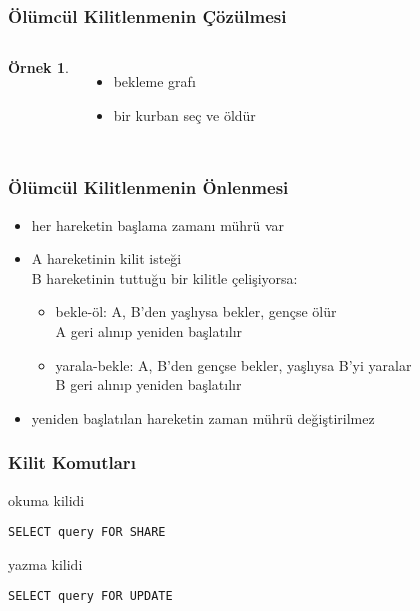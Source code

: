 \documentclass[dvipsnames]{beamer}
\theoremstyle{definition}
\theoremstyle{example}
\newtheorem{ornek}[theorem]{Örnek}
\theoremstyle{plain}
\begin{document}
\begin{frame}
  \frametitle{Ölümcül Kilitlenmenin Çözülmesi}

  \begin{columns}[t]
    \begin{ornek}
      \begin{center}
      \end{center}
    \end{ornek}

    \begin{itemize}
      \item bekleme grafı

      \pause
      \item bir \alert{kurban} seç ve öldür
    \end{itemize}
  \end{columns}
\end{frame}

\begin{frame}
  \frametitle{Ölümcül Kilitlenmenin Önlenmesi}

  \begin{itemize}
    \item her hareketin başlama zamanı mührü var

    \pause
    \item A hareketinin kilit isteği\\
      B hareketinin tuttuğu bir kilitle çelişiyorsa:
    \begin{itemize}
      \item \alert{bekle-öl}: A, B'den yaşlıysa bekler, gençse ölür\\
        A geri alınıp yeniden başlatılır

      \item \alert{yarala-bekle}: A, B'den gençse bekler, yaşlıysa B'yi
        yaralar\\
        B geri alınıp yeniden başlatılır
    \end{itemize}

    \pause
    \item yeniden başlatılan hareketin zaman mührü değiştirilmez
  \end{itemize}
\end{frame}

\begin{frame}[fragile]
  \frametitle{Kilit Komutları}

  \begin{block}{okuma kilidi}
    \begin{lstlisting}
SELECT query FOR SHARE
    \end{lstlisting}
  \end{block}

  \pause
  \begin{block}{yazma kilidi}
    \begin{lstlisting}
SELECT query FOR UPDATE
    \end{lstlisting}
  \end{block}
\end{frame}
\end{document}
